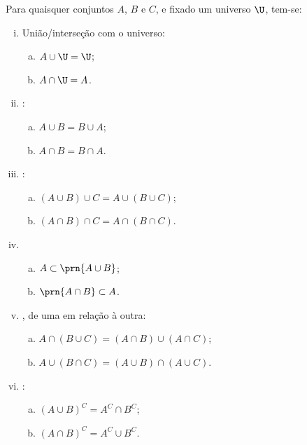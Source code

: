 \begin{proposition}
\label{prop:uniao-e-intersecao}
Para quaisquer conjuntos $A$, $B$ e $C$, e fixado um universo $\U$, tem-se:
\begin{enumerate}[i)]
    \item
        União/interseção com o universo:
        \begin{enumerate}[a)]
            \item $A\cup \U = \U$;
            \item $A \cap \U = A$.
        \end{enumerate}
    \item
        :
        \begin{enumerate}[a)]
            \item $A \cup B = B \cup A$;
            \item $A \cap B = B \cap A$.
        \end{enumerate}

    \item
        :
        \begin{enumerate}[a)]
            \item $\left(A \cup B \right) \cup C = A \cup \left( B \cup C \right)$;
            \item $\left(A \cap B \right) \cap C = A \cap \left( B \cap C \right)$.
        \end{enumerate}

    \item
        \begin{enumerate}[a)]
            \label{prop:uniao-e-intersecao-inclusao}
            \item
                \label{prop:uniao-inclusao}
                $A \subset \prn{A \cup B}$;
            \item
                \label{prop:intersecao-inclusao}
                $\prn{A \cap B} \subset A$.
        \end{enumerate}

    \item
        , de uma em relação à outra:
        \begin{enumerate}[a)]
            \item $A \cap \left( B \cup C \right) = \left(A \cap B \right) \cup \left( A \cap C \right)$;
            \item $A \cup \left( B \cap C \right) = \left(A \cup B \right) \cap \left( A \cup C  \right)$.
        \end{enumerate}

    \item
        \label{prop:demorgan}
        :
        \begin{enumerate}[a)]
            \item $\left( A \cup B \right)^C = A^C \cap B^C$;
            \item $\left(A \cap B \right)^C = A^C \cup B^C$.
        \end{enumerate}
\end{enumerate}
\end{proposition}

